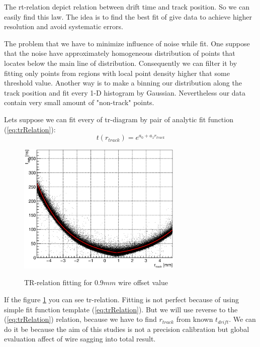 \documentclass[]{article}
\begin{document}
	The rt-relation depict relation between drift time and track position. So we can easily find this law. The idea is to find the best fit of give data to achieve higher resolution and avoid systematic errors.
	
	The problem that we have to minimize influence of noise while fit. One suppose that the noise have approximately homogeneous distribution of points that locates below the main line of distribution. Consequently we can filter it by fitting only points from regions with local point density higher that some threshold value. Another way is to make a binning our distribution along the track position and fit every 1-D histogram by Gaussian. Nevertheless our data contain very small amount of "non-track" points.
	
	Lets suppose we can fit every of tr-diagram by pair of analytic fit function (\ref{eq:trRelation}):
	\begin{equation}
	t(r_{track}) = e^{a_0 + a_1r_{track}}
	\label{eq:trRelation}
	\end{equation}
	
	\begin{figure}[h!]
	\centering
	\includegraphics[width=0.7\textwidth]{TRrelation_09_points}
	\label{fig:TRrelation09points}
	\caption{TR-relation fitting for $0.9 mm$ wire offset value}
	\end{figure}
	
	If the figure \ref{fig:TRrelation09points} you can see tr-relation. Fitting is not perfect because of using simple fit function template (\ref{eq:trRelation}). But we will use reverse to the (\ref{eq:trRelation}) relation, because we have to find $r_{track}$ from known $t_{drift}$. We can do it be because the aim of this studies is not a precision calibration but global evaluation affect of wire sagging into total result.
	
\end{document}
